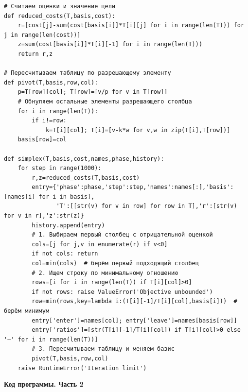 \documentclass[12pt,a4paper]{article}
\begin{document}
\begin{Verbatim}[fontsize=\scriptsize,breaklines=true,breakanywhere=true]
# Считаем оценки и значение цели
def reduced_costs(T,basis,cost):
    r=[cost[j]-sum(cost[basis[i]]*T[i][j] for i in range(len(T))) for j in range(len(cost))]
    z=sum(cost[basis[i]]*T[i][-1] for i in range(len(T)))
    return r,z

# Пересчитываем таблицу по разрешающему элементу
def pivot(T,basis,row,col):
    p=T[row][col]; T[row]=[v/p for v in T[row]]
    # Обнуляем остальные элементы разрешающего столбца
    for i in range(len(T)):
        if i!=row:
            k=T[i][col]; T[i]=[v-k*w for v,w in zip(T[i],T[row])]
    basis[row]=col

def simplex(T,basis,cost,names,phase,history):
    for step in range(1000):
        r,z=reduced_costs(T,basis,cost)
        entry={'phase':phase,'step':step,'names':names[:],'basis':[names[i] for i in basis],
               'T':[[str(v) for v in row] for row in T],'r':[str(v) for v in r],'z':str(z)}
        history.append(entry)
        # 1. Выбираем первый столбец с отрицательной оценкой
        cols=[j for j,v in enumerate(r) if v<0]
        if not cols: return
        col=min(cols)  # берём первый подходящий столбец
        # 2. Ищем строку по минимальному отношению
        rows=[i for i in range(len(T)) if T[i][col]>0]
        if not rows: raise ValueError('Objective unbounded')
        row=min(rows,key=lambda i:(T[i][-1]/T[i][col],basis[i]))  # берём минимум
        entry['enter']=names[col]; entry['leave']=names[basis[row]]
        entry['ratios']=[str(T[i][-1]/T[i][col]) if T[i][col]>0 else '—' for i in range(len(T))]
        # 3. Пересчитываем таблицу и меняем базис
        pivot(T,basis,row,col)
    raise RuntimeError('Iteration limit')
\end{Verbatim}

\newpage
\par\textbf{Код программы. Часть 2}\par
\end{document}
